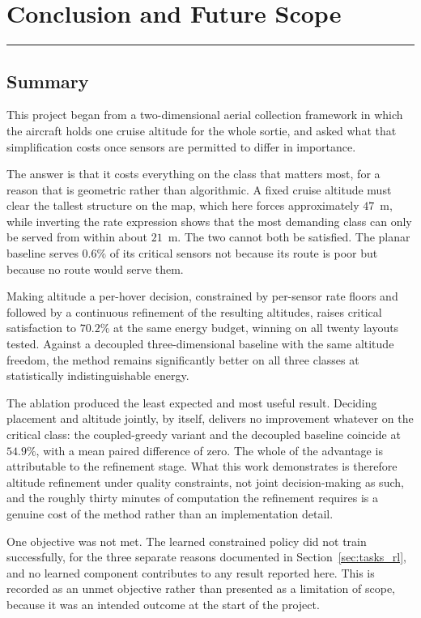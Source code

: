 \chapter{Conclusion and Future Scope}
\label{chap:conclusion}
\noindent \rule{6.6in}{0.01in}
\minitoc
\newpage

\section{Summary}

This project began from a two-dimensional aerial collection framework in which the aircraft holds one cruise altitude for the whole sortie, and asked what that simplification costs once sensors are permitted to differ in importance.

The answer is that it costs everything on the class that matters most, for a reason that is geometric rather than algorithmic. A fixed cruise altitude must clear the tallest structure on the map, which here forces approximately $47$~m, while inverting the rate expression shows that the most demanding class can only be served from within about $21$~m. The two cannot both be satisfied. The planar baseline serves $0.6\%$ of its critical sensors not because its route is poor but because no route would serve them.

Making altitude a per-hover decision, constrained by per-sensor rate floors and followed by a continuous refinement of the resulting altitudes, raises critical satisfaction to $70.2\%$ at the same energy budget, winning on all twenty layouts tested. Against a decoupled three-dimensional baseline with the same altitude freedom, the method remains significantly better on all three classes at statistically indistinguishable energy.

The ablation produced the least expected and most useful result. Deciding placement and altitude jointly, by itself, delivers no improvement whatever on the critical class: the coupled-greedy variant and the decoupled baseline coincide at $54.9\%$, with a mean paired difference of zero. The whole of the advantage is attributable to the refinement stage. What this work demonstrates is therefore altitude refinement under quality constraints, not joint decision-making as such, and the roughly thirty minutes of computation the refinement requires is a genuine cost of the method rather than an implementation detail.

One objective was not met. The learned constrained policy did not train successfully, for the three separate reasons documented in Section~\ref{sec:tasks_rl}, and no learned component contributes to any result reported here. This is recorded as an unmet objective rather than presented as a limitation of scope, because it was an intended outcome at the start of the project.

